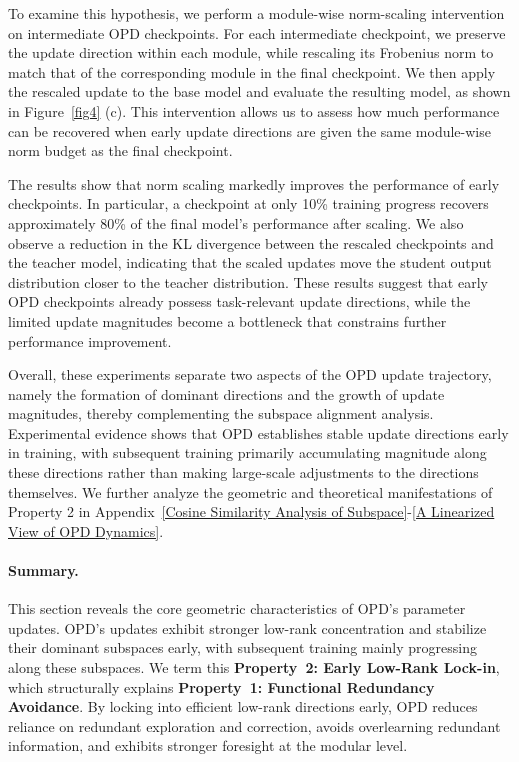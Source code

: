 \documentclass{llmxive}
\begin{document}
To examine this hypothesis, we perform a module-wise norm-scaling intervention on intermediate OPD checkpoints. For each intermediate checkpoint, we preserve the update direction within each module, while rescaling its Frobenius norm to match that of the corresponding module in the final checkpoint. We then apply the rescaled update to the base model and evaluate the resulting model, as shown in Figure~\ref{fig4} (c). This intervention allows us to assess how much performance can be recovered when early update directions are given the same module-wise norm budget as the final checkpoint.

The results show that norm scaling markedly improves the performance of early checkpoints. In particular, a checkpoint at only 10\% training progress recovers approximately 80\% of the final model's performance after scaling. We also observe a reduction in the KL divergence between the rescaled checkpoints and the teacher model, indicating that the scaled updates move the student output distribution closer to the teacher distribution. These results suggest that early OPD checkpoints already possess task-relevant update directions, while the limited update magnitudes become a bottleneck that constrains further performance improvement.

Overall, these experiments separate two aspects of the OPD update trajectory, namely the formation of dominant directions and the growth of update magnitudes, thereby complementing the subspace alignment analysis. Experimental evidence shows that OPD establishes stable update directions early in training, with subsequent training primarily accumulating magnitude along these directions rather than making large-scale adjustments to the directions themselves. We further analyze the geometric and theoretical manifestations of Property 2 in Appendix~\ref{Cosine Similarity Analysis of Subspace}-\ref{A Linearized View of OPD Dynamics}.

\paragraph{Summary.} This section reveals the core geometric characteristics of OPD's parameter updates. OPD's updates exhibit stronger low-rank concentration and stabilize their dominant subspaces early, with subsequent training mainly progressing along these subspaces. We term this \textbf{Property~2: Early Low-Rank Lock-in}, which structurally explains \textbf{Property~1: Functional Redundancy Avoidance}. By locking into efficient low-rank directions early, OPD reduces reliance on redundant exploration and correction, avoids overlearning redundant information, and exhibits stronger foresight at the modular level.
\end{document}
